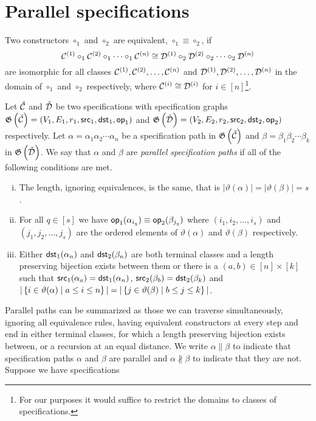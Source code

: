 \section{Parallel specifications}
\begin{definition}
Two constructors $\circ_1$ and $\circ_2$ are equivalent, $\circ_1 \equiv \circ_2$, if
\[
    \mathcal{C}^{\left(1\right)} \circ_1 \mathcal{C}^{\left(2\right)} \circ_1 \dotsm \circ_1 \mathcal{C}^{\left(n\right)} \cong \mathcal{D}^{\left(1\right)} \circ_2 \mathcal{D}^{\left(2\right)} \circ_2 \dotsm \circ_2 \mathcal{D}^{\left(n\right)}
\]
are isomorphic for all classes $\mathcal{C}^{\left(1\right)},\mathcal{C}^{\left(2\right)},\dotsc,\mathcal{C}^{\left(n\right)}$ and $\mathcal{D}^{\left(1\right)},\mathcal{D}^{\left(2\right)},\dotsc,\mathcal{D}^{\left(n\right)}$ in the domain of $\circ_1$ and $\circ_2$ respectively, where $\mathcal{C}^{\left(i\right)}\cong\mathcal{D}^{\left(i\right)}$ for $i \in [n]$\footnote{For our purposes it would suffice to restrict the domains to classes of specifications.}.
\end{definition}
\begin{definition}
Let $\check{\mathcal{C}}$ and $\check{\mathcal{D}}$ be two specifications with specification graphs $\mathfrak{G}\left(\check{\mathcal{C}}\right)=(V_1,E_1,r_1,\textsf{src}_1,\textsf{dst}_1,\textsf{op}_1)$ and $\mathfrak{G}\left(\check{\mathcal{D}}\right) = (V_2,E_2,r_2,\textsf{src}_2,\textsf{dst}_2,\textsf{op}_2)$ respectively. Let $\alpha=\alpha_1\alpha_2 \dotsm \alpha_n$ be a specification path in $\mathfrak{G}\left(\check{\mathcal{C}}\right)$ and $\beta=\beta_1\beta_2 \dotsm \beta_k$ in $\mathfrak{G}\left(\check{\mathcal{D}}\right)$. We say that $\alpha$ and $\beta$ are \emph{parallel specification paths} if all of the following conditions are met.
\begin{enumerate}[i.]
    \item The length, ignoring equivalences, is the same, that is $|\vartheta(\alpha)| = |\vartheta(\beta)| = s$.
    \item For all $q\in[s]$ we have $\textsf{op}_1(\alpha_{i_q}) \equiv \textsf{op}_2(\beta_{j_q})$ where $(i_1,i_2,\dotsc,i_s)$ and $(j_1,j_2,\dotsc,j_s)$ are the ordered elements of $\vartheta(\alpha)$ and $\vartheta(\beta)$ respectively.
    \item Either $\textsf{dst}_1(\alpha_n)$ and $\textsf{dst}_2(\beta_n)$ are both terminal classes and a length preserving bijection exists between them or there is a $(a,b) \in [n] \times [k]$ such that $\textsf{src}_1(\alpha_a) = \textsf{dst}_1(\alpha_n)$, $\textsf{src}_2(\beta_b) = \textsf{dst}_2(\beta_k)$ and $|\left\{i \in \vartheta(\alpha) \mid a \leq i \leq n\right\}| = |\left\{j \in \vartheta(\beta) \mid b \leq j \leq k\right\}|$.
\end{enumerate}
\end{definition}
Parallel paths can be summarized as those we can traverse simultaneously, ignoring all equivalence rules, having equivalent constructors at every step and end in either terminal classes, for which a length preserving bijection exists between, or a recursion at an equal distance. We write $\alpha \parallel \beta$ to indicate that specification paths $\alpha$ and $\beta$ are parallel and $\alpha \nparallel \beta$ to indicate that they are not. Suppose we have specifications
